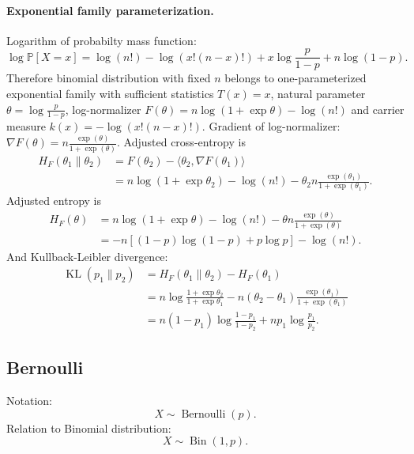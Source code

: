 \documentclass[a4paper,11pt]{article}
\theoremstyle{plain}
\theoremstyle{definition}
\newcommand{\MP}{\mathbb{P}}
\begin{document}
	\paragraph{Exponential family parameterization.}
	Logarithm of probabilty mass function:
	\[ \log \MP[X = x] = \log(n!) - \log(x!(n-x)!) + x \log \frac{p}{1-p} + n \log(1-p). \]
	Therefore binomial distribution with fixed $n$ belongs to one-parameterized exponential family with sufficient statistics $T(x) = x$, natural parameter $\theta = \log \frac{p}{1-p}$, log-normalizer $F(\theta) = n \log (1 + \exp \theta) - \log(n!)$ and carrier measure $k(x)=-\log(x!(n-x)!)$. Gradient of log-normalizer: $\nabla F(\theta) = n \frac{\exp(\theta)}{1+\exp(\theta)}$. Adjusted cross-entropy is
	\[ 
	\begin{aligned}
	H_F(\theta_1 \| \theta_2) & = F(\theta_2) - \langle \theta_2, \nabla F(\theta_1) \rangle \\
	& = n \log (1 + \exp \theta_2) - \log(n!) - \theta_2 n \frac{\exp(\theta_1)}{1+\exp(\theta_1)}.
	\end{aligned}
	\]
	Adjusted entropy is
	\[
	\begin{aligned}
	H_F(\theta) & = n \log (1 + \exp \theta) - \log(n!) - \theta n \frac{\exp(\theta)}{1+\exp(\theta)} \\
	& = -n[(1-p)\log(1-p) + p \log p] - \log(n!).
    \end{aligned}
	\]
	And Kullback-Leibler divergence:
	\[
	\begin{aligned}
	\operatorname{KL}(p_1 \| p_2) & = H_F(\theta_1 \| \theta_2) - H_F(\theta_1) \\
	& = n \log \frac{1+\exp \theta_2}{1+\exp \theta_1} - n (\theta_2 - \theta_1)\frac{\exp(\theta_1)}{1+\exp(\theta_1)} \\
	& = n(1-p_1)\log\frac{1-p_1}{1-p_2} + n p_1 \log\frac{p_1}{p_2}.
    \end{aligned}
	\]
	
	\subsection{Bernoulli}
	Notation:
	\[ X \sim \operatorname{Bernoulli}(p). \]
	Relation to Binomial distribution: \[X \sim \operatorname{Bin}(1, p). \]
	
	\pagebreak
\end{document}
